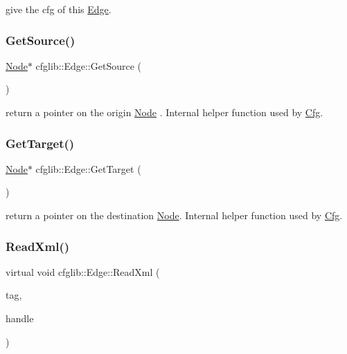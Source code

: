 give the cfg of this \hyperlink{classcfglib_1_1Edge}{Edge}. \mbox{\label{classcfglib_1_1Edge_a217bd00a0276e3753ad8e34c2e57de44}} 
\subsubsection{\texorpdfstring{Get\+Source()}{GetSource()}}
{\footnotesize\ttfamily \hyperlink{classcfglib_1_1Node}{Node}$\ast$ cfglib\+::\+Edge\+::\+Get\+Source (\begin{DoxyParamCaption}{ }\end{DoxyParamCaption})}

return a pointer on the origin \hyperlink{classcfglib_1_1Node}{Node} . Internal helper function used by \hyperlink{classcfglib_1_1Cfg}{Cfg}. \mbox{\label{classcfglib_1_1Edge_ac5af20f98b5f5ceaad6383f1a953cc4e}} 
\subsubsection{\texorpdfstring{Get\+Target()}{GetTarget()}}
{\footnotesize\ttfamily \hyperlink{classcfglib_1_1Node}{Node}$\ast$ cfglib\+::\+Edge\+::\+Get\+Target (\begin{DoxyParamCaption}{ }\end{DoxyParamCaption})}

return a pointer on the destination \hyperlink{classcfglib_1_1Node}{Node}. Internal helper function used by \hyperlink{classcfglib_1_1Cfg}{Cfg}. \mbox{\label{classcfglib_1_1Edge_af7eb95612c30e993771c519a2240cd77}} 
\subsubsection{\texorpdfstring{Read\+Xml()}{ReadXml()}}
{\footnotesize\ttfamily virtual void cfglib\+::\+Edge\+::\+Read\+Xml (\begin{DoxyParamCaption}\item[{\hyperlink{classXmlTag}{Xml\+Tag} const $\ast$}]{tag,  }\item[{\hyperlink{classcfglib_1_1Handle}{Handle} \&}]{handle }\end{DoxyParamCaption})\hspace{0.3cm}{\ttfamily [virtual]}}


